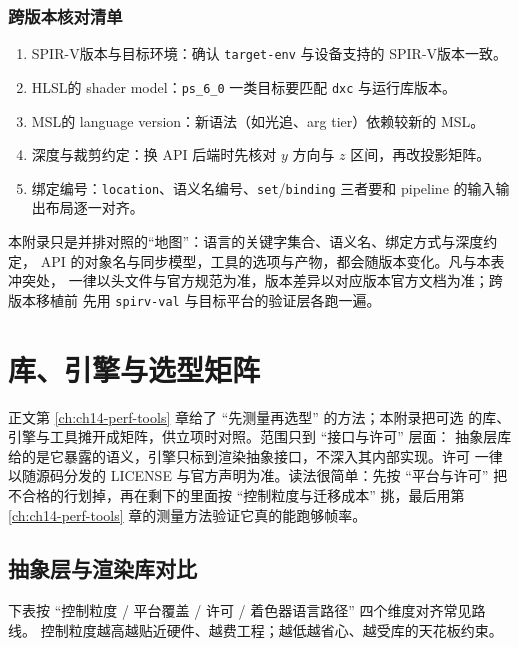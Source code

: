 \documentclass[12pt,a4paper,fontset=fandol]{ctexbook}
\newcommand{\Tp}[1]{\texttt{#1}}
\newcommand{\Bk}{\discretionary{}{}{}}
\newcommand{\Lang}[1]{\textsf{#1}}
\newcommand{\HSL}{\Lang{HLSL}}
\newcommand{\MSL}{\Lang{MSL}}
\newcommand{\SPIV}{\Lang{SPIR-V}}
\begin{document}
\subsection{跨版本核对清单}

\begin{enumerate}
  \item \SPIV 版本与目标环境：确认 \Tp{target-env} 与设备支持的 \SPIV 版本一致。
  \item \HSL 的 shader model：\Tp{ps\_6\_0} 一类目标要匹配 \Tp{dxc} 与运行库版本。
  \item \MSL 的 language version：新语法（如光追、arg tier）依赖较新的 \MSL。
  \item 深度与裁剪约定：换 API 后端时先核对 $y$ 方向与 $z$ 区间，再改投影矩阵。
  \item 绑定编号：\Tp{location}、语义名编号、\Tp{set}/{\Bk}\Tp{binding} 三者要和
        pipeline 的输入输出布局逐一对齐。
\end{enumerate}

\begin{guideline}[title={速查以头文件与官方规范为准}]
本附录只是并排对照的``地图''：语言的关键字集合、语义名、绑定方式与深度约定，
API 的对象名与同步模型，工具的选项与产物，都会随版本变化。凡与本表冲突处，
一律以头文件与官方规范为准，版本差异以对应版本官方文档为准；跨版本移植前
先用 \Tp{spirv-val} 与目标平台的验证层各跑一遍。
\end{guideline}

\chapter{库、引擎与选型矩阵}
\label{ap:apC-library-choice}

正文第 \ref{ch:ch14-perf-tools} 章给了 ``先测量再选型'' 的方法；本附录把可选
的库、引擎与工具摊开成矩阵，供立项时对照。范围只到 ``接口与许可'' 层面：
抽象层库给的是它暴露的语义，引擎只标到渲染抽象接口，不深入其内部实现。许可
一律以随源码分发的 LICENSE 与官方声明为准。读法很简单：先按 ``平台与许可''
把不合格的行划掉，再在剩下的里面按 ``控制粒度与迁移成本'' 挑，最后用第
\ref{ch:ch14-perf-tools} 章的测量方法验证它真的能跑够帧率。

\section{抽象层与渲染库对比}

下表按 ``控制粒度 / 平台覆盖 / 许可 / 着色器语言路径'' 四个维度对齐常见路线。
控制粒度越高越贴近硬件、越费工程；越低越省心、越受库的天花板约束。
\end{document}
